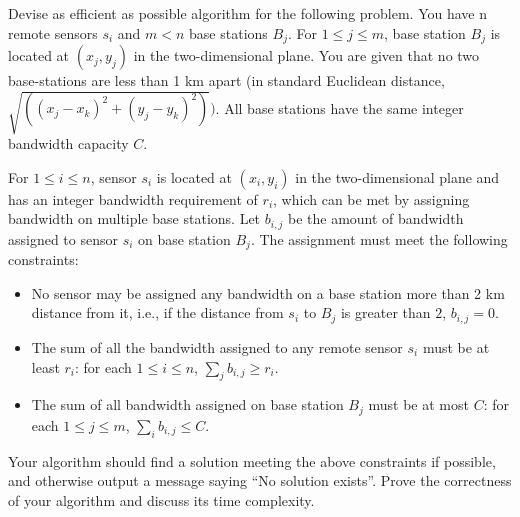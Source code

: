 \newpage
{} %

\problemdes

Devise as efficient as possible algorithm for the following problem. You have n remote sensors $s_i$ and $m < n$ base stations $B_j$. For $1 \le j \le m$, base station $B_j$ is located at $(x_j,y_j)$ in the two-dimensional plane. You are given that no two base-stations are less than 1 km apart (in standard Euclidean distance, $\sqrt{\left(\left(x_{j}-x_{k}\right)^{2}+\left(y_{j}-y_{k}\right)^{2}\right)})$. All base stations have the same integer bandwidth capacity $C$.

For $1 \le i \le n$, sensor $s_i$ is located at $(x_i, y_i)$ in the two-dimensional plane and has an integer bandwidth requirement of $r_i$, which can be met by assigning bandwidth on multiple base stations. Let $b_{i,j}$ be the amount of bandwidth assigned to sensor $s_i$ on base station $B_j$. The assignment must meet the following constraints:

\begin{itemize}
\item No sensor may be assigned any bandwidth on a base station more than 2 km distance from it, i.e., if the distance from $s_i$ to $B_j$ is greater than $2$, $b_{i,j} = 0$.
\item The sum of all the bandwidth assigned to any remote sensor $s_i$ must be at least $r_i$: for each $1 \leq i \leq n$, $\sum_{j} b_{i, j} \geq r_{i}$.
\item The sum of all bandwidth assigned on base station $B_j$ must be at most $C$: for each $1 \leq j \leq m$, $\sum_{i} b_{i, j} \leq C$.
\end{itemize}

Your algorithm should find a solution meeting the above constraints if possible, and otherwise output a message saying “No solution exists”. Prove the correctness of your algorithm and discuss its time complexity.

\solution















